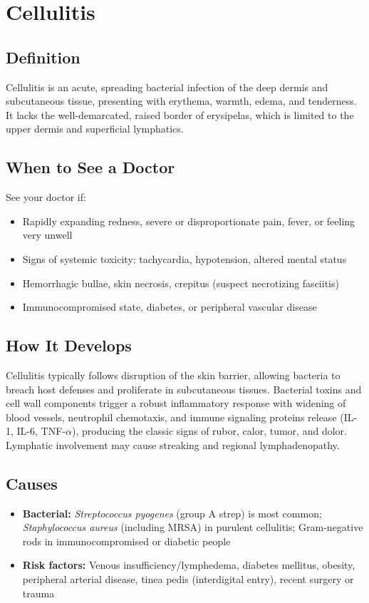 \chapter{Cellulitis}

\section*{Definition}
Cellulitis is an acute, spreading bacterial infection of the deep dermis and subcutaneous tissue, presenting with erythema, warmth, edema, and tenderness. It lacks the well-demarcated, raised border of erysipelas, which is limited to the upper dermis and superficial lymphatics.

\section*{When to See a Doctor}
See your doctor if:
\begin{itemize}
  \item Rapidly expanding redness, severe or disproportionate pain, fever, or feeling very unwell
  \item Signs of systemic toxicity: tachycardia, hypotension, altered mental status
  \item Hemorrhagic bullae, skin necrosis, crepitus (suspect necrotizing fasciitis)
  \item Immunocompromised state, diabetes, or peripheral vascular disease
\end{itemize}

\section*{How It Develops}
Cellulitis typically follows disruption of the skin barrier, allowing bacteria to breach host defenses and proliferate in subcutaneous tissues. Bacterial toxins and cell wall components trigger a robust inflammatory response with widening of blood vessels, neutrophil chemotaxis, and immune signaling proteins release (IL-1, IL-6, TNF-\ensuremath{\alpha}), producing the classic signs of rubor, calor, tumor, and dolor. Lymphatic involvement may cause streaking and regional lymphadenopathy.

\section*{Causes}
\begin{itemize}
  \item \textbf{Bacterial:} \textit{Streptococcus pyogenes} (group A strep) is most common; \textit{Staphylococcus aureus} (including MRSA) in purulent cellulitis; Gram-negative rods in immunocompromised or diabetic people
  \item \textbf{Risk factors:} Venous insufficiency/lymphedema, diabetes mellitus, obesity, peripheral arterial disease, tinea pedis (interdigital entry), recent surgery or trauma
\end{itemize}

